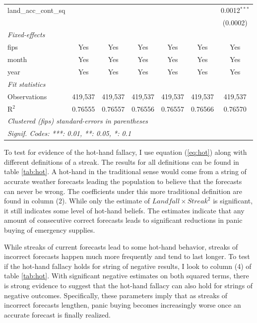\documentclass{article}
\begin{document}
\begin{table}[htbp]
\begin{tabular}{lcccccc}
      land\_acc\_cont\_sq     &                 &                 &                 &                 &                & 0.0012$^{***}$\\   
                              &                 &                 &                 &                 &                & (0.0002)\\   
      \midrule
      \emph{Fixed-effects}\\
      fips                    & Yes             & Yes             & Yes             & Yes             & Yes            & Yes\\  
      month                   & Yes             & Yes             & Yes             & Yes             & Yes            & Yes\\  
      year                    & Yes             & Yes             & Yes             & Yes             & Yes            & Yes\\  
      \midrule
      \emph{Fit statistics}\\
      Observations            & 419,537         & 419,537         & 419,537         & 419,537         & 419,537        & 419,537\\  
      R$^2$                   & 0.76555         & 0.76557         & 0.76556         & 0.76557         & 0.76566        & 0.76570\\  
      \midrule \midrule
      \multicolumn{7}{l}{\emph{Clustered (fips) standard-errors in parentheses}}\\
      \multicolumn{7}{l}{\emph{Signif. Codes: ***: 0.01, **: 0.05, *: 0.1}}\\
   \end{tabular}
\end{table}


To test for evidence of the hot-hand fallacy, I use equation (\ref{eq:hot}) along with different definitions of a streak. The results for all definitions can be found in table \ref{tab:hot}. A hot-hand in the traditional sense would come from a string of accurate weather forecasts leading the population to believe that the forecasts can never be wrong. The coefficients under this more traditional definition are found in column (2). While only the estimate of $Landfall \times Streak^2$ is significant, it still indicates some level of hot-hand beliefs. The estimates indicate that any amount of consecutive correct forecasts leads to significant reductions in panic buying of emergency supplies. 

While streaks of current forecasts lead to some hot-hand behavior, streaks of incorrect forecasts happen much more frequently and tend to last longer. To test if the hot-hand fallacy holds for string of negative results, I look to column (4) of table \ref{tab:hot}.
With significant negative estimates on both squared terms, there is strong evidence to suggest that the hot-hand fallacy can also hold for strings of negative outcomes. Specifically, these parameters imply that as streaks of incorrect forecasts lengthen, panic buying becomes increasingly worse once an accurate forecast is finally realized. 
\end{document}
